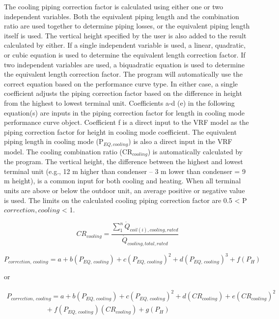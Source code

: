 The cooling piping correction factor is calculated using either one or two independent variables. Both the equivalent piping length and the combination ratio are used together to determine piping losses, or the equivalent piping length itself is used. The vertical height specified by the user is also added to the result calculated by either. If a single independent variable is used, a linear, quadratic, or cubic equation is used to determine the equivalent length correction factor. If two independent variables are used, a biquadratic equation is used to determine the equivalent length correction factor. The program will automatically use the correct equation based on the performance curve type. In either case, a single coefficient adjusts the piping correction factor based on the difference in height from the highest to lowest terminal unit. Coefficients a-d (e) in the following equation(s) are inputs in the piping correction factor for length in cooling mode performance curve object. Coefficient f is a direct input to the VRF model as the piping correction factor for height in cooling mode coefficient. The equivalent piping length in cooling mode (P\(_{EQ,cooling}\)) is also a direct input in the VRF model. The cooling combination ratio (CR\(_{cooling}\)) is automatically calculated by the program. The vertical height, the difference between the highest and lowest terminal unit (e.g., 12 m higher than condenser – 3 m lower than condenser = 9 m height), is a common input for both cooling and heating. When all terminal units are above or below the outdoor unit, an average positive or negative value is used. The limits on the calculated cooling piping correction factor are 0.5 < P\(correction,cooling\) < 1.

\begin{equation}
  CR_{cooling} = \frac{\sum\limits_1^n {\dot{Q}_{coil(i),cooling,rated}}}{\dot{Q}_{cooling,total,rated}}
\end{equation}

\begin{equation}
  P_{correction,\,cooling} = a + b \left( P_{EQ,\,cooling} \right) + c \left( P_{EQ,\,cooling} \right)^2 + d \left( P_{EQ,\,cooling} \right)^3 + f \left( P_H \right)
\end{equation}

or

\begin{equation}
  \begin{array}{l}
  P_{correction,\,cooling} = a + b \left( P_{EQ,\,cooling} \right) + c \left( P_{EQ,\,cooling} \right)^2 + d \left( CR_{cooling} \right) + e \left( CR_{cooling} \right)^2 \\
  \,\,\,\,\,\,\,\,\,\,\,\,\,\,\,\,\,\,\,\,\,\,\,\,\,\,\,\,\,\,\,\,\,\, + f \left( P_{EQ,\,cooling} \right) \left( CR_{cooling} \right) + g \left( P_H \right)
  \end{array}
\end{equation}

